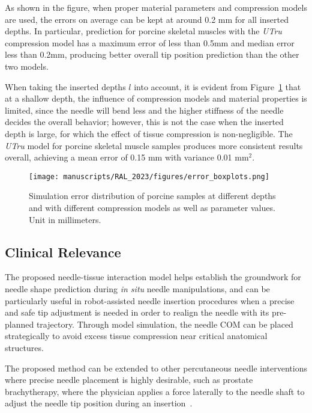 As shown in the figure, when proper material parameters and compression models are used, the errors on average can be kept at around 0.2 mm for all inserted depths. In particular, prediction for porcine skeletal muscles with the \textit{UTru} compression model has a maximum error of less than 0.5mm and median error less than 0.2mm, producing better overall tip position prediction than the other two models.

When taking the inserted depths $l$ into account, it is evident from Figure~\ref{fig:chap-3-error-boxplots} that at a shallow depth, the influence of compression models and material properties is limited, since the needle will bend less and the higher stiffness of the needle decides the overall behavior; however, this is not the case when the inserted depth is large, for which the effect of tissue compression is non-negligible. The \textit{UTru} model for porcine skeletal muscle samples produces more consistent results overall, achieving a mean error of 0.15 mm with variance 0.01 mm$^2$.

\begin{figure}[t]
   \centering
   \texttt{[image: manuscripts/RAL\_2023/figures/error\_boxplots.png]}
   \caption{Simulation error distribution of porcine samples at different depths and with different compression models as well as parameter values. Unit in millimeters.}
   \label{fig:chap-3-error-boxplots}
 \end{figure}

\subsection{Clinical Relevance}
\label{sec:clinical_relevance}

The proposed needle-tissue interaction model helps establish the groundwork for needle shape prediction during \textit{in situ} needle manipulations, and can be particularly useful in robot-assisted needle insertion procedures when a precise and safe tip adjustment is needed in order to realign the needle with its pre-planned trajectory. Through model simulation, the needle COM can be placed strategically to avoid excess tissue compression near critical anatomical structures.

The proposed method can be extended to other percutaneous needle interventions where precise needle placement is highly desirable, such as prostate brachytherapy, where the physician applies a force laterally to the needle shaft to adjust the needle tip position during an insertion~\parencite{jamaluddinIntraoperativeFactorsAssociated2017}.

